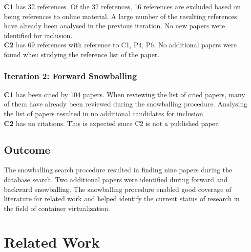 \textbf{C1} has 32 references. Of the 32 references, 16 references are excluded based on being references to online material. A large number of the resulting references have already been analysed in the previous iteration. No new papers were identified for inclusion.\\ 

\textbf{C2} has 69 references with reference to C1, P4, P6. No additional papers were found when studying the reference list of the paper.

\subsubsection*{Iteration 2: Forward Snowballing}
\textbf{C1} has been cited by 104 papers. When reviewing the list of cited papers, many of them have already been reviewed during the snowballing procedure.  Analysing the list of papers resulted in no additional candidates for inclusion.\\ 
 
\textbf{C2} has no citations. This is expected since C2 is not a published paper. 


\subsection{Outcome}
The snowballing search procedure resulted in finding nine papers during the database search. Two additional papers were identified during forward and backward snowballing. The snowballing procedure enabled good coverage of literature for related work and helped identify the current status of research in the field of container virtualization. 


\section{Related Work} 




